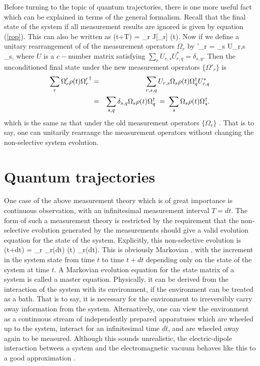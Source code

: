 \documentclass[12pt]{article}
\begin{document}
Before
turning to the topic of quantum trajectories, there is one more useful fact which can
be explained in terms of the general formalism. Recall that the final state of the
system if all measurement results are ignored is given by equation (\ref{rop}). This
can also be written as \beq
\rho(t+T) = \sum_r {\cal J}[\Omega_r] \rho(t).
\eeq
Now if we define a unitary rearrangement of of the measurement operators
$\Omega_r$ by
\beq
\Omega'_r = \sum_s U_{r,s} \Omega_s,
\eeq
where $U$ is a $c-$number matrix satisfying
$
\sum_r U_{r,s} U^*_{r,q} = \delta_{s,q}.
$
Then the unconditioned final state under the new measurement operators
$\{\Omega'_r\}$ is
 \begin{eqnarray}
\sum_r \Omega'_{r} \rho(t) {\Omega'_r}^\dagger &=& 
\sum_{r,s,q} U_{r,s} \Omega_s \rho(t)
\Omega_{q}^\dagger U^*_{r,q} \\
&=& \sum_{s,q} \delta_{s,q} 
\Omega_s\rho(t)\Omega_{q}^\dagger \; = \; \sum_s 
\Omega_s\rho(t)\Omega_{s}^\dagger . \label{aeie}
\end{eqnarray}
which is the same as that under the old measurement operators
$\{\Omega_r\}$ . That is to  say, one can
unitarily rearrange the measurement operators without changing the non-selective
system evolution.

\section{Quantum trajectories}

One case of the above measurement theory which is of great 
importance is continuous observation, with an infinitesimal 
measurement interval $T=dt$. The form of such a measurement 
theory is restricted by the requirement that the non-selective evolution
generated by the measurements should give a valid evolution equation 
for the state of the system. Explicitly, this non-selective evolution is 
\beq \label{markovmeast}
\rho(t+dt) = \sum_{r} \Omega_{r}(dt) \rho(t) 
\Omega_{r}\dg (dt).
\eeq
This is obviously Markovian \cite{Gar85}, with the increment in the 
system state from time $t$ to time $t+dt$ depending only on the state 
of the system at time $t$. A Markovian 
evolution equation for the state matrix of a system is called a master 
equation. Physically, it can be derived from the interaction of the 
system with its environment, if the environment can be treated as a 
bath. That is to say, it is necessary for the environment to irreversibly 
carry away information from the system. Alternatively, one can view the
environment  as a continuous stream of independently prepared apparatuses 
which are wheeled up to the system, interact for an infinitesimal time 
$dt$, and are wheeled away again to be measured. Although this 
sounds unrealistic, the electric-dipole interaction between a system
and the electromagnetic vacuum behaves like this to a good
approximation \cite{GarParZol92,Wis95b}.
\end{document}
